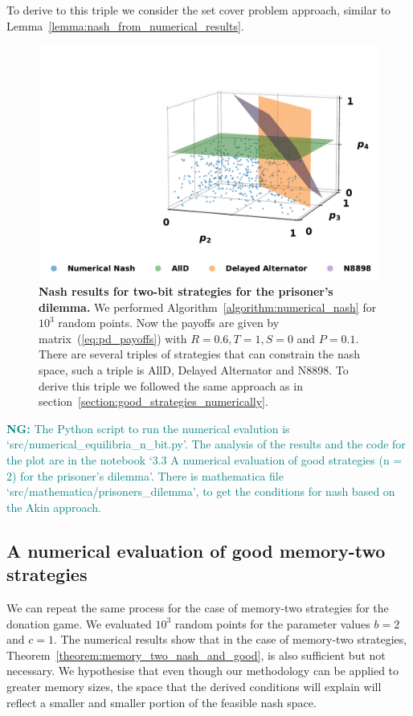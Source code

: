 \documentclass{article}
\theoremstyle{definition}
\newcommand{\nikoleta}[1]{\textcolor{teal}{{\bf NG:} #1}}
\begin{document}
  To derive to this triple we consider the set cover problem approach, similar
  to Lemma~\ref{lemma:nash_from_numerical_results}.

\begin{figure}[!htbp]
  \centering
  \includegraphics[width=.55\textwidth]{static/two_bit_reactive_numerical_results_prisoners_dilemma.pdf}
  \caption{\textbf{Nash results for two-bit strategies for the prisoner's dilemma.}
  We performed Algorithm~\ref{algorithm:numerical_nash} for \(10 ^ 3\) random
  points. Now the payoffs are given by matrix~(\ref{eq:pd_payoffs})
  with \(R=0.6, T=1, S=0\) and \(P=0.1\). There are several triples of
  strategies that can constrain the nash space, such a triple is AllD, Delayed
  Alternator and N8898. To derive this triple we followed the same approach as
  in section~\ref{section:good_strategies_numerically}.}
  \label{fig:numerical_results_prisoners_dilemma}
\end{figure}

\nikoleta{The Python script to run the numerical evalution is
`src/numerical\_equilibria\_n\_bit.py'. The analysis of the results and the code
for the plot are in the notebook `3.3 A numerical evaluation of good strategies
(n = 2) for the prisoner's dilemma'. There is mathematica file
`src/mathematica/prisoners\_dilemma', to get the conditions for nash based on
the Akin approach.}

\subsection{A numerical evaluation of good memory-two strategies}\label{section:good_strategies_numerically_mem_two}

We can repeat the same process for the case of memory-two strategies for the
donation game. We evaluated \(10^3\) random points for the parameter values \(b=2\)
and \(c=1\). The numerical results show that in the case of memory-two strategies,
Theorem~\ref{theorem:memory_two_nash_and_good}, is also sufficient but not
necessary. We hypothesise that even though our methodology can be applied to
greater memory sizes, the space that the derived conditions will explain will
reflect a smaller and smaller portion of the feasible nash space.
\end{document}
